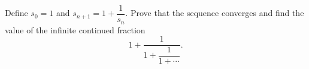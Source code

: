 Define $s_0=1$ and $s_{n+1}=1+\dfrac{1}{s_n}$. Prove that the sequence converges and find the value of the infinite continued fraction
\[1+\dfrac{1}{1+\dfrac{1}{1+\cdots}}.\]
